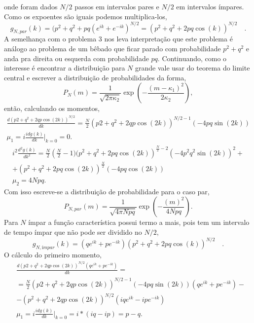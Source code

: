 \documentclass[12pt]{article}
\begin{document}
onde foram dados $N/2$ passos em intervalos pares e $N/2$ em intervalos ímpares. Como os expoentes são iguais podemos multiplica-los,
\begin{equation}
g_{N,par}(k) = (p^2 + q^2 + pq(e^{ik} + e^{-ik})^{N/2} = (p^2 + q^2 + 2pq\cos(k))^{N/2} \quad.
\end{equation}
A semelhança com o problema $3$ nos leva interpretação que este problema é análogo ao problema de um bêbado que ficar parado com probabilidade $p^2 + q^2$ e anda pra direita ou esquerda com probabilidade $pq$. Continuando, como o interesse é encontrar a distribuição para $N$ grande vale usar do teorema do limite central e escrever a distribuição de probabilidades da forma,
\begin{equation}
P_{N}(m) = \frac{1}{\sqrt{2\pi\kappa_2}}\exp{\left(-\frac{(m-\kappa_1)^2}{2\kappa_2}\right)}, 
\end{equation}
então, calculando os momentos,
\begin{equation}
\begin{split}
\frac{d(p2 + q^2 + 2qp\cos(2k))^{N/2}}{dk} = \frac{N}{2}\left(p2 + q^2 + 2qp\cos(2k)\right)^{N/2 - 1}\left(-4pq\sin(2k)\right)\\
\mu_1 = i\frac{idg(k)}{dk}\Big\rvert_{k=0} = 0. 
\end{split}
\end{equation}
\begin{equation}
\begin{split}
i^2\frac{d^2g(k)}{dk^2} =  \frac{N}{2}\left(\frac{N}{2}-1)(p^2 + q^2 + 2pq\cos(2k)\right)^{\frac{N}{2}-2}\left(-4p^2q^2\sin(2k)\right)^2 +\\
+ \left(p^2 + q^2 + 2pq\cos(2k)\right)^{\frac{N}{2}}(-4pq\cos(2k))\\
\mu_2 = 4Npq.
\end{split}
\end{equation}
Com isso escreve-se a distribuição de probabilidade para o caso par,
\begin{equation}
P_{N, par}(m) = \frac{1}{\sqrt{4\pi Npq}}\exp{\left(-\frac{(m)^2}{4Npq}\right)}.
\end{equation}
Para $N$ ímpar a função característica possui termo a mais, pois tem um intervalo de tempo ímpar que não pode ser dividido no $N/2$, 
\begin{equation}
g_{N,ímpar}(k) = (qe^{ik} + pe^{-ik})(p^2 + q^2 + 2pq\cos(k))^{N/2} \quad.
\end{equation}
O cálculo do primeiro momento,
\begin{equation}
\begin{split}
&\frac{d(p2 + q^2 + 2qp\cos(2k))^{N/2}(qe^{ik} + pe^{-ik})}{dk} = \\
&= \frac{N}{2}\left(p2 + q^2 + 2qp\cos(2k)\right)^{N/2 - 1}\left(-4pq\sin(2k)\right)(qe^{ik} + pe^{-ik})- \\
& - (p^2 + q^2 + 2qp\cos(2k))^{N/2}(iqe^{ik}-ipe^{-ik})\\
&\mu_1 = i\frac{idg(k)}{dk}\Big\rvert_{k=0} = i*(iq - ip) = p - q. 
\end{split}
\end{equation}
\end{document}

